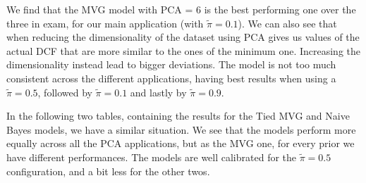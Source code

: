 \documentclass[12pt, a4paper]{article}
\begin{document}
We find that the MVG model with PCA = 6 is the best performing one over the three in exam, for our main application (with $\tilde{\pi} = 0.1$). We can also see that when reducing the dimensionality of the dataset using PCA gives us values of the actual DCF that are more similar to the ones of the minimum one. Increasing the dimensionality instead lead to bigger deviations.
The model is not too much consistent across the different applications, having best results when using a $\tilde{\pi} = 0.5$, followed by $\tilde{\pi} = 0.1$ and lastly by $\tilde{\pi} = 0.9$.

In the following two tables, containing the results for the Tied MVG and Naive Bayes models, we have a similar situation. We see that the models perform more equally across all the PCA applications, but as the MVG one, for every prior we have different performances. The models are well calibrated for the $\tilde{\pi} = 0.5$ configuration, and a bit less for the other twos. 

\clearpage
\end{document}

